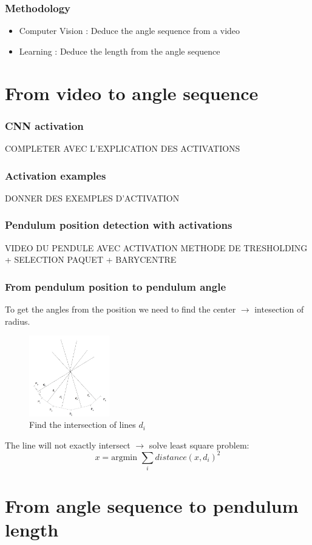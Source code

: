 \documentclass{beamer}
\begin{document}
\begin{frame}
\frametitle{Methodology}
\begin{itemize}
  \item Computer Vision : Deduce the angle sequence from a video
  \item Learning : Deduce the length from the angle sequence
\end{itemize}
\end{frame}

\section{From video to angle sequence}

\begin{frame}
\frametitle{CNN activation}
COMPLETER AVEC L'EXPLICATION DES ACTIVATIONS
\end{frame}

\begin{frame}
\frametitle{Activation examples}
DONNER DES EXEMPLES D'ACTIVATION
\end{frame}

\begin{frame}
\frametitle{Pendulum position detection with activations}
VIDEO DU PENDULE AVEC ACTIVATION
METHODE DE TRESHOLDING + SELECTION PAQUET + BARYCENTRE
\end{frame}

\begin{frame}
\frametitle{From pendulum position to pendulum angle}
To get the angles from the position we need to find the center $\rightarrow$ intesection of radius.
\begin{figure}
  \captionsetup{labelformat=empty}
  \includegraphics[height=3.5cm]{find_center.png}
  \caption{Find the intersection of lines $d_i$}
\end{figure}
The line will not exactly intersect $\rightarrow$ solve least square problem:
\[
  x = \text{argmin }\sum_i distance(x, d_i)^2
\]
\end{frame}

\section{From angle sequence to pendulum length}
\end{document}
